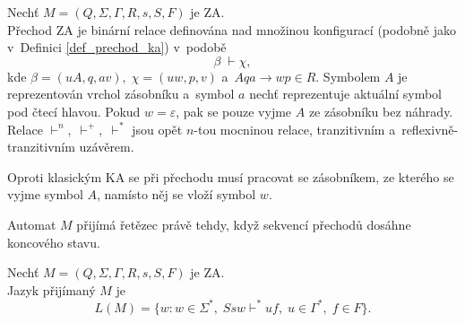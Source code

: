 \begin{definition}\label{def_prechod_za}
    Nechť $M = (Q, \Sigma, \Gamma, R, s, S, F)$ je ZA.\\
    Přechod ZA je binární relace definována nad množinou konfigurací (podobně jako v~Definici \ref{def_prechod_ka}) v~podobě
    \begin{equation*}
        \beta\; \vdash \chi,
    \end{equation*}
    kde $\beta = (uA, q, av),\; \chi = (uw, p, v)$ a~$Aqa \rightarrow wp \in R$.
    Symbolem $A$ je reprezentován vrchol zásobníku a~symbol $a$ nechť reprezentuje aktuální symbol pod čtecí hlavou.
    Pokud $w = \varepsilon$, pak se pouze vyjme $A$ ze zásobníku bez náhrady.
    Relace $\vdash^n,\; \vdash^+,\; \vdash^*$ jsou opět $n$-tou mocninou relace, tranzitivním a~reflexivně-tran\-zi\-tiv\-ním uzávěrem.
\end{definition}
Oproti klasickým KA se při přechodu musí pracovat se zásobníkem, ze kterého se vyjme symbol $A$, namísto něj se vloží symbol $w$.

Automat $M$ přijímá řetězec právě tehdy, když sekvencí přechodů dosáhne koncového stavu.
\begin{definition}\label{def_jazyk_za}
    Nechť $M = (Q, \Sigma, \Gamma, R, s, S, F)$ je ZA.\\
    Jazyk přijímaný $M$ je
    \begin{equation*}
        L(M) = \{w : w \in \Sigma^*,\; Ssw \vdash^* uf,\; u \in \Gamma^*,\; f \in F\}.
    \end{equation*}
\end{definition}

